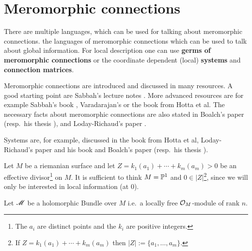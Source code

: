 \chapter{Meromorphic connections}
There are multiple languages, which can be used for talking about meromorphic
connections.
 the languages of meromorphic connections which can be used to
talk about global information.
For local description one can use \textbf{germs of meromorphic connections} or
the coordinate dependent (local) \textbf{systems} and \textbf{connection
matrices}. 

Meromorphic connections are introduced and discussed in many resources.
A good starting point are Sabbah's lecture notes \cite{sabbah_cimpa90}.
More advanced resources are for example
Sabbah's book \cite{sabbah2007isomonodromic},
Varadarajan's \cite{Varadarajan96linearmeromorphic} or
the book \cite{hotta2008} from Hotta et al.
The necessary facts about meromorphic connections are also stated in
Boalch's paper \cite{boalch} (resp.\ his thesis \cite{thboalch}),
and Loday-Richaud's paper \cite{Loday1994}.

Systems are, for example, discussed in 
the book \cite{hotta2008} from Hotta et al,
Loday-Richaud's paper \cite{Loday1994} and his book \cite{Loday2014} and
Boalch's paper \cite{boalch} (resp.\ his thesis \cite{thboalch}).

Let $M$ be a riemanian surface and let $Z=k_1(a_1)+\cdots+k_m(a_m)>0$ be an
effective divisor\footnote{The $a_i$ are distinct points and the $k_i$ are
positive integers.} on $M$.
It is sufficient to think $M=\P^1$ and $0\in|Z|$\footnote{If
$Z=k_1(a_1)+\cdots+k_m(a_m)$ then $|Z|:=\{a_1,\dots,a_m\}$.}, since we will
only be interested in local information (at $0$).

Let $\sM$ be a holomorphic Bundle over $M$ i.e.\ a locally free $\cO_M$-module
of rank $n$.

